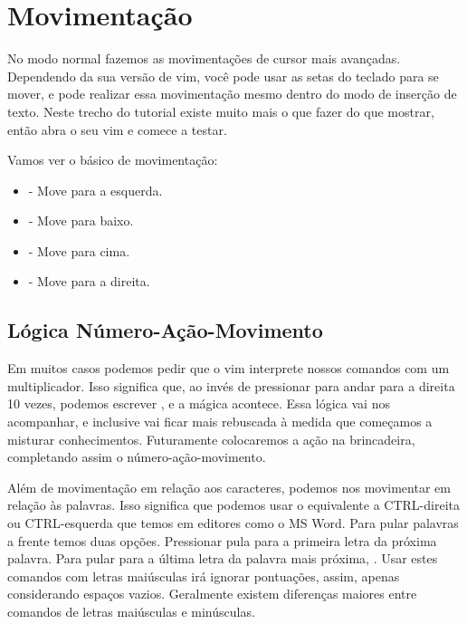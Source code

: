 
\section{Movimentação}
No modo normal fazemos as movimentações de cursor mais avançadas.
Dependendo da sua versão de vim, você pode usar as setas do teclado para se mover,
e pode realizar essa movimentação mesmo dentro do modo de inserção de texto.
Neste trecho do tutorial existe muito mais o que fazer do que mostrar,
então abra o seu vim e comece a testar.

Vamos ver o básico de movimentação:
\begin{itemize}
    \item {} - Move para a esquerda.
    \item {} - Move para baixo.
    \item {} - Move para cima.
    \item {} - Move para a direita.
\end{itemize}



\subsection{Lógica Número-Ação-Movimento}
Em muitos casos podemos pedir que o vim interprete nossos comandos com um multiplicador.
Isso significa que, ao invés de pressionar  para andar para a direita 10 vezes,
podemos escrever , e a mágica acontece.
Essa lógica vai nos acompanhar, e inclusive vai ficar mais rebuscada à medida que começamos a misturar conhecimentos.
Futuramente colocaremos a ação na brincadeira, completando assim o número-ação-movimento.


Além de movimentação em relação aos caracteres, podemos nos movimentar em relação às palavras.
Isso significa que podemos usar o equivalente a CTRL-direita ou CTRL-esquerda que temos em editores como o MS Word.
Para pular palavras a frente temos duas opções.
Pressionar  pula para a primeira letra da próxima palavra.
Para pular para a última letra da palavra mais próxima, .
Usar estes comandos com letras maiúsculas irá ignorar pontuações, assim, apenas considerando espaços vazios.
Geralmente existem diferenças maiores entre comandos de letras maiúsculas e minúsculas.

